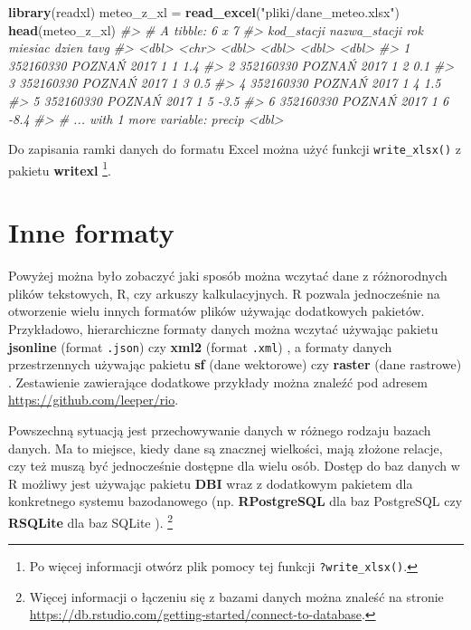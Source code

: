 \documentclass[paper=6in:9in,pagesize=pdftex,headinclude=on,footinclude=on,10pt]{scrbook}
\newenvironment{Shaded}{\begin{snugshade}}{\end{snugshade}}
\newcommand{\CommentTok}[1]{\textcolor[rgb]{0.56,0.35,0.01}{\textit{#1}}}
\newcommand{\KeywordTok}[1]{\textcolor[rgb]{0.13,0.29,0.53}{\textbf{#1}}}
\newcommand{\NormalTok}[1]{#1}
\newcommand{\StringTok}[1]{\textcolor[rgb]{0.31,0.60,0.02}{#1}}
\begin{document}
\begin{Shaded}
\begin{Highlighting}[]
\KeywordTok{library}\NormalTok{(readxl)}
\NormalTok{meteo_z_xl =}\StringTok{ }\KeywordTok{read_excel}\NormalTok{(}\StringTok{"pliki/dane_meteo.xlsx"}\NormalTok{)}
\KeywordTok{head}\NormalTok{(meteo_z_xl)}
\CommentTok{#> # A tibble: 6 x 7}
\CommentTok{#>   kod_stacji nazwa_stacji   rok miesiac dzien  tavg}
\CommentTok{#>        <dbl> <chr>        <dbl>   <dbl> <dbl> <dbl>}
\CommentTok{#> 1  352160330 POZNAŃ        2017       1     1   1.4}
\CommentTok{#> 2  352160330 POZNAŃ        2017       1     2   0.1}
\CommentTok{#> 3  352160330 POZNAŃ        2017       1     3   0.5}
\CommentTok{#> 4  352160330 POZNAŃ        2017       1     4   1.5}
\CommentTok{#> 5  352160330 POZNAŃ        2017       1     5  -3.5}
\CommentTok{#> 6  352160330 POZNAŃ        2017       1     6  -8.4}
\CommentTok{#> # ... with 1 more variable: precip <dbl>}
\end{Highlighting}
\end{Shaded}

Do zapisania ramki danych do formatu Excel można użyć funkcji \texttt{write\_xlsx()} z pakietu \textbf{writexl} \citep{R-writexl}\footnote{Po więcej informacji otwórz plik pomocy tej funkcji \texttt{?write\_xlsx()}.}.

\hypertarget{inne-formaty}{%
\section{Inne formaty}\label{inne-formaty}}

Powyżej można było zobaczyć jaki sposób można wczytać dane z różnorodnych plików tekstowych, R, czy arkuszy kalkulacyjnych.
R pozwala jednocześnie na otworzenie wielu innych formatów plików używając dodatkowych pakietów.
Przykładowo, hierarchiczne formaty danych można wczytać używając pakietu \textbf{jsonline} (format \texttt{.json}) \citep{R-jsonlite} czy \textbf{xml2} (format \texttt{.xml}) \citep{R-xml2}, a formaty danych przestrzennych używając pakietu \textbf{sf} (dane wektorowe) \citep{R-sf} czy \textbf{raster} (dane rastrowe) \citep{R-raster}.
Zestawienie zawierające dodatkowe przykłady można znaleźć pod adresem \url{https://github.com/leeper/rio}.

Powszechną sytuacją jest przechowywanie danych w różnego rodzaju bazach danych.
Ma to miejsce, kiedy dane są znacznej wielkości, mają złożone relacje, czy też muszą być jednocześnie dostępne dla wielu osób.
Dostęp do baz danych w R możliwy jest używając pakietu \textbf{DBI} \citep{R-DBI} wraz z dodatkowym pakietem dla konkretnego systemu bazodanowego (np. \textbf{RPostgreSQL} dla baz PostgreSQL \citep{R-RPostgreSQL} czy \textbf{RSQLite} dla baz SQLite \citep{R-RSQLite}). \footnote{Więcej informacji o łączeniu się z bazami danych można znaleść na stronie \url{https://db.rstudio.com/getting-started/connect-to-database}.}
\end{document}
